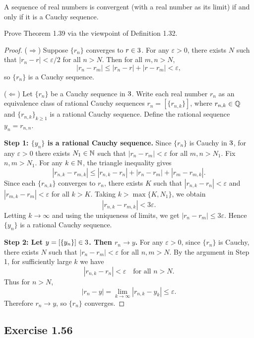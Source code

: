 \documentclass{article}
\begin{document}
\begin{theorem}
  A sequence of real numbers is convergent (with a real number as its
  limit) if and only if it is a Cauchy sequence.
\end{theorem}

Prove Theorem 1.39 via the viewpoint of Definition 1.32.

\begin{proof}
  ($\Rightarrow$) Suppose $\{r_n\}$ converges to $r \in 3$. For any
  $\varepsilon > 0$, there exists $N$ such that $|r_n - r| < \varepsilon/2$
  for all $n > N$. Then for all $m, n > N$,
  \[
    |r_n - r_m| \le |r_n - r| + |r - r_m| < \varepsilon,
  \]
  so $\{r_n\}$ is a Cauchy sequence.

  ($\Leftarrow$) Let $\{r_n\}$ be a Cauchy sequence in $3$. Write each
  real number $r_n$ as an equivalence class of rational Cauchy sequences
  $r_n = [\{r_{n,k}\}]$, where $r_{n,k} \in \mathbb{Q}$ and $\{r_{n,k}\}_{k\ge1}$
  is a rational Cauchy sequence. Define the rational sequence $y_n =
  r_{n,n}$.

  \textbf{Step 1: $\{y_n\}$ is a rational Cauchy sequence.} Since
  $\{r_n\}$ is Cauchy in $3$, for any $\varepsilon > 0$ there exists
  $N_1 \in \mathbb{N}$ such that $|r_n - r_m| < \varepsilon$ for all $m, n > N_1$.
  Fix $n, m > N_1$. For any $k \in \mathbb{N}$, the triangle inequality gives
  \[
    |r_{n,k} - r_{m,k}| \le |r_{n,k} - r_n| + |r_n - r_m| + |r_m - r_{m,k}|.
  \]
  Since each $\{r_{n,k}\}$ converges to $r_n$, there exists $K$ such that
  $|r_{n,k} - r_n| < \varepsilon$ and $|r_{m,k} - r_m| < \varepsilon$ for
  all $k > K$. Taking $k > \max\{K, N_1\}$, we obtain
  \[
    |r_{n,k} - r_{m,k}| < 3\varepsilon.
  \]
  Letting $k \to \infty$ and using the uniqueness of limits, we get
  $|r_n - r_m| \le 3\varepsilon$. Hence $\{y_n\}$ is a rational Cauchy
  sequence.

  \textbf{Step 2: Let $y = [\{y_n\}] \in 3$. Then $r_n \to y$.} For any
  $\varepsilon > 0$, since $\{r_n\}$ is Cauchy, there exists $N$ such that
  $|r_n - r_m| < \varepsilon$ for all $n, m > N$. By the argument in Step
  1, for sufficiently large $k$ we have
  \[
    |r_{n,k} - r_n| < \varepsilon \quad \text{for all } n > N.
  \]
  Thus for $n > N$,
  \[
    |r_n - y| = \lim_{k\to\infty} |r_{n,k} - y_k| \le \varepsilon.
  \]
  Therefore $r_n \to y$, so $\{r_n\}$ converges.
\end{proof}

\subsection{Exercise 1.56}
\end{document}

